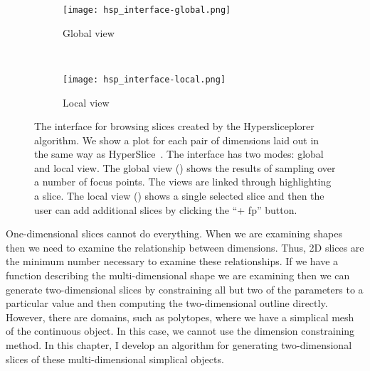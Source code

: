 
\begin{figure}
  \centering
  \begin{subfigure}[b]{0.45\linewidth}
    \texttt{[image: hsp\_interface-global.png]}
    \caption{Global view}
    \label{fig:interface:global} 
  \end{subfigure} 
  ~
  \begin{subfigure}[b]{0.45\linewidth}
    \texttt{[image: hsp\_interface-local.png]}
    \caption{Local view}
    \label{fig:interface:local} 
  \end{subfigure}
  \caption{%
    The interface for browsing slices created by the Hypersliceplorer algorithm.
    We show a plot for each pair of dimensions laid out in the same way as
    HyperSlice~\cite{Wijk:1993}.
    The interface has two modes: global and local view.
    The global view () 
    shows the results of sampling over a number of focus points. The views
    are linked through highlighting a slice. The local view 
    () shows a single selected slice and then
    the user can add additional slices by clicking the ``+ fp'' button.
  }
  \label{fig:interface}
\end{figure}

One-dimensional slices cannot do everything. When we are examining shapes then
we need to examine the relationship between dimensions. Thus, 2D slices are the
minimum number necessary to examine these relationships.
If we have a function describing the multi-dimensional shape we are examining
then we can generate two-dimensional slices by constraining all but two of the
parameters to a particular value and then computing the two-dimensional outline
directly. However, there are domains, such as polytopes,
where we have a simplical mesh of the continuous object. In this case, we cannot
use the dimension constraining method. In this chapter, I develop an algorithm
for generating two-dimensional slices of these multi-dimensional simplical 
objects. 









